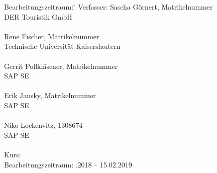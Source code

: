 \begin{titlepage}
\begin{center}
\begin{minipage}{\textwidth}
		\begin{tabbing}
			Bearbeitungszeitraum: \hspace{0.85cm}\=\kill
			Verfasser: \> Sascha Görnert, Matrikelnummer \\
			\> DER Touristik GmbH \\
			\> \\
			\> Rene Fischer, Matrikelnummer \\
			\> Technische Universität Kaiserslautern \\
			\> \\
			\> Gerrit Pollkläsener, Matrikelnummer \\
			\> SAP SE \\
			\> \\
			\> Erik Jansky, Matrikelnummer \\
			\> SAP SE \\
			\> \\
			\> Niko Lockenvitz, 1308674 \\
			\> SAP SE \\
			\> \\[1.5mm]
			Kurs: \> \DieKursbezeichnung \\[1.5mm]
			Bearbeitungszeitraum: .2018 -- 15.02.2019
	\end{tabbing}

	\end{minipage}

\end{center}

\end{titlepage}